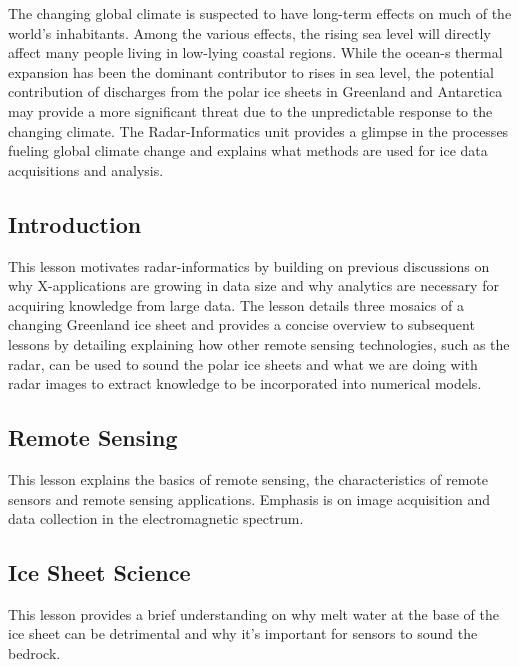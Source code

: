 The changing global climate is suspected to have long-term effects on
much of the world's inhabitants. Among the various effects, the rising
sea level will directly affect many people living in low-lying coastal
regions. While the ocean-s thermal expansion has been the dominant
contributor to rises in sea level, the potential contribution of
discharges from the polar ice sheets in Greenland and Antarctica may
provide a more significant threat due to the unpredictable response to
the changing climate. The Radar-Informatics unit provides a glimpse in
the processes fueling global climate change and explains what methods
are used for ice data acquisitions and analysis.


\subsection{Introduction}

This lesson motivates radar-informatics by building on previous
discussions on why X-applications are growing in data size and why
analytics are necessary for acquiring knowledge from large data. The
lesson details three mosaics of a changing Greenland ice sheet and
provides a concise overview to subsequent lessons by detailing
explaining how other remote sensing technologies, such as the radar, can
be used to sound the polar ice sheets and what we are doing with radar
images to extract knowledge to be incorporated into numerical models.


\subsection{Remote Sensing}

This lesson explains the basics of remote sensing, the characteristics
of remote sensors and remote sensing applications. Emphasis is on image
acquisition and data collection in the electromagnetic spectrum.


\subsection{Ice Sheet Science}

This lesson provides a brief understanding on why melt water at the base
of the ice sheet can be detrimental and why it's important for sensors
to sound the bedrock.

